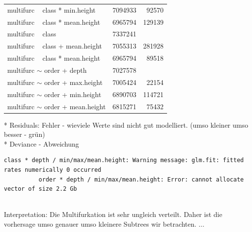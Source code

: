 \begin{center}
\begin{longtable}{ |l|r|r| }
            multifurc ~ class * min.height & 7094933 & 92570 \\
            \rowcolor{green!50} multifurc ~ class * mean.height & 6965794 & 129139 \\
            \hline \hline
            multifurc ~ class & 7337241 & \\
            multifurc ~ class + mean.height & 7055313 & 281928 \\
            \rowcolor{green!50} multifurc ~ class * mean.height & 6965794 & 89518 \\
            \hline \hline \hline
            multifurc $\sim$ order + depth & 7027578 & \\
            multifurc $\sim$ order + max.height & 7005424 & 22154 \\
            multifurc $\sim$ order + min.height & 6890703 & 114721 \\
            \rowcolor{green!50} multifurc $\sim$ order + mean.height & 6815271 & 75432 \\
            \hline
          \end{longtable}
        \end{center}
        * Residuals: Fehler - wieviele Werte sind nicht gut modelliert. (umso kleiner umso besser - grün) \\
        * Deviance - Abweichung \\
        
        \begin{lstlisting}[gobble=8]
          class * depth / min/max/mean.height: Warning message: glm.fit: fitted rates numerically 0 occurred
          order * depth / min/max/mean.height: Error: cannot allocate vector of size 2.2 Gb
        \end{lstlisting}

         \\
        Interpretation: Die Multifurkation ist sehr ungleich verteilt. Daher ist die vorhersage umso 
          genauer umso kleinere Subtrees wir betrachten. ...
        
         \\ \\

